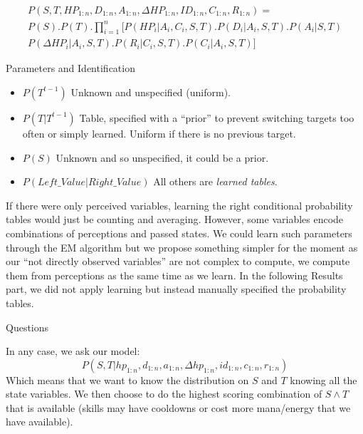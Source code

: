 \begin{eqnarray*}
P(S, T, HP_{1:n}, D_{1:n}, A_{1:n}, \Delta HP_{1:n}, ID_{1:n}, C_{1:n}, R_{1:n}) = \\
P(S).P(T).\prod_{i=1}^n [ P(HP_i | A_i, C_i, S, T).P(D_i | A_i, S, T).P(A_i | S, T) \\
        P(\Delta HP_i | A_i, S, T). P(R_i | C_i, S, T). P(C_i | A_i, S, T) ]
\end{eqnarray*}

\begin{center}
Parameters and Identification
\end{center}

\begin{itemize}
    \item $P(T^{t-1})$ Unknown and unspecified (uniform).
    \item $P(T|T^{t-1})$ Table, specified with a ``prior'' to prevent switching targets too often or simply learned. Uniform if there is no previous target.
    \item $P(S)$ Unknown and so unspecified, it could be a prior.
    \item $P(Left\_Value | Right\_Value)$ All others are \textit{learned tables}.
\end{itemize}

If there were only perceived variables, learning the right conditional probability tables would just be counting and averaging. However, some variables encode combinations of perceptions and passed states. We could learn such parameters through the EM algorithm but we propose something simpler for the moment as our ``not directly observed variables'' are not complex to compute, we compute them from perceptions as the same time as we learn. In the following Results part, we did not apply learning but instead manually specified the probability tables.

\begin{center}
Questions
\end{center}

In any case, we ask our model:\\
$$P(S,T|hp_{1:n},d_{1:n}, a_{1:n}, \Delta hp_{1:n}, id_{1:n}, c_{1:n}, r_{1:n})$$ 
Which means that we want to know the distribution on $S$ and $T$ knowing all the state variables. We then choose to do the highest scoring combination of $S \wedge T$ that is available (skills may have cooldowns or cost more mana/energy that we have available).

